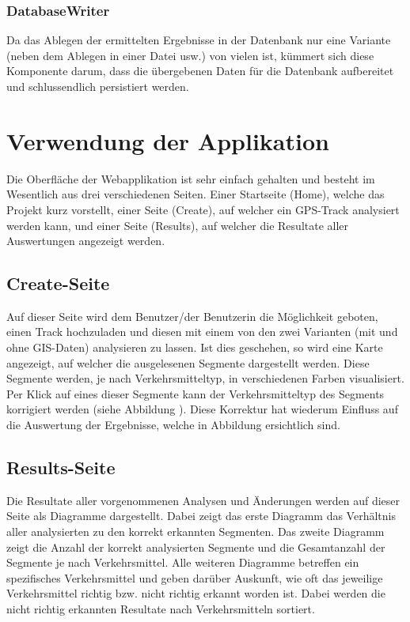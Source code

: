 \subsubsection{DatabaseWriter}
Da das Ablegen der ermittelten Ergebnisse in der Datenbank  nur eine Variante (neben dem Ablegen  in einer Datei usw.) von vielen ist, kümmert sich diese Komponente darum, dass die übergebenen Daten für die Datenbank aufbereitet und schlussendlich persistiert werden.

\section{Verwendung der Applikation}
Die Oberfläche der Webapplikation ist sehr einfach gehalten und besteht im Wesentlich aus drei verschiedenen Seiten. Einer Startseite (Home), welche das Projekt kurz vorstellt, einer Seite (Create), auf welcher ein GPS-Track analysiert werden kann, und einer Seite (Results), auf welcher die Resultate aller Auswertungen angezeigt werden.

\subsection{Create-Seite}
Auf dieser Seite wird dem Benutzer/der Benutzerin die Möglichkeit geboten, einen Track hochzuladen und diesen mit einem von den zwei Varianten (mit und ohne GIS-Daten) analysieren zu lassen. Ist dies geschehen, so wird eine Karte angezeigt, auf welcher die ausgelesenen Segmente dargestellt werden. Diese Segmente werden, je nach Verkehrsmitteltyp, in verschiedenen Farben visualisiert. Per Klick auf eines dieser Segmente kann der Verkehrsmitteltyp des Segments korrigiert werden (siehe Abbildung ). Diese Korrektur hat wiederum Einfluss auf die Auswertung der Ergebnisse, welche in Abbildung  ersichtlich sind.


\subsection{Results-Seite}
\label{results-seite}
Die Resultate aller vorgenommenen Analysen und Änderungen werden auf dieser Seite als Diagramme dargestellt. Dabei zeigt das erste Diagramm das Verhältnis aller analysierten zu den korrekt erkannten Segmenten. Das zweite Diagramm zeigt die Anzahl der korrekt analysierten Segmente und die Gesamtanzahl der Segmente je nach Verkehrsmittel. Alle weiteren Diagramme betreffen ein spezifisches Verkehrsmittel und geben darüber Auskunft, wie oft das jeweilige Verkehrsmittel richtig bzw. nicht richtig erkannt worden ist. Dabei werden die nicht richtig erkannten Resultate nach Verkehrsmitteln sortiert.

